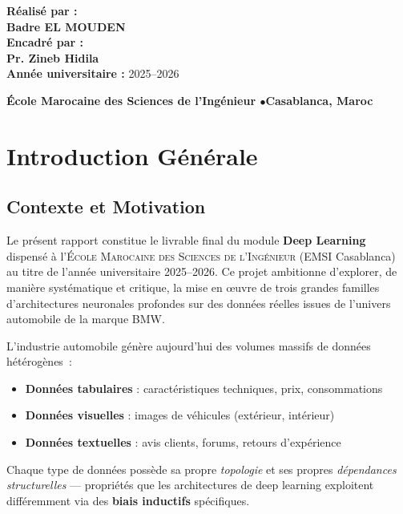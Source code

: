 \documentclass[12pt,a4paper]{report}
\begin{document}
\begin{titlepage}
\vspace{1cm}
\begin{center}
\large\textbf{\textcolor{bmwblue}{Réalisé par :}}\\[0.3cm]
{\LARGE\bfseries\color{bmwaccent} Badre EL MOUDEN}\\[0.5cm]
\large\textbf{\textcolor{bmwblue}{Encadré par :}}\\[0.3cm]
{\LARGE\bfseries\color{bmwaccent} Pr. Zineb Hidila}\\[0.3cm]
{\textcolor{bmwblue}{\bfseries Année universitaire :} 2025--2026}
\end{center}

\vspace{0.8cm}
\begin{center}
{\small\color{bmwblue!60}\sffamily
\bfseries École Marocaine des Sciences de l'Ingénieur \quad$\bullet$\quad Casablanca, Maroc}
\end{center}
\vfill
\end{titlepage}

\tableofcontents\newpage

\chapter*{Introduction Générale}
\vspace{0.3cm}

\section*{Contexte et Motivation}

Le présent rapport constitue le livrable final du module \textbf{Deep Learning} dispensé à 
l'\textsc{École Marocaine des Sciences de l'Ingénieur} (EMSI Casablanca) au titre de l'année 
universitaire 2025--2026. Ce projet ambitionne d'explorer, de manière systématique et critique, 
la mise en \oe{}uvre de trois grandes familles d'architectures neuronales profondes sur des données 
réelles issues de l'univers automobile de la marque BMW.

L'industrie automobile génère aujourd'hui des volumes massifs de données hétérogènes~:
\begin{itemize}[leftmargin=*,nosep]
    \item \textbf{Données tabulaires} : caractéristiques techniques, prix, consommations
    \item \textbf{Données visuelles} : images de véhicules (extérieur, intérieur)
    \item \textbf{Données textuelles} : avis clients, forums, retours d'expérience
\end{itemize}
Chaque type de données possède sa propre \textit{topologie} et ses propres \textit{dépendances 
structurelles} — propriétés que les architectures de deep learning exploitent différemment 
via des \textbf{biais inductifs} spécifiques.
\end{document}
